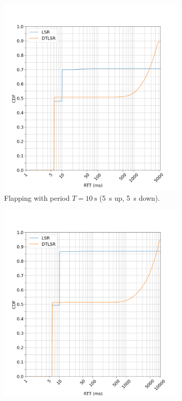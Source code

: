\documentclass[withindex,glossary,openany]{cam-thesis}
\begin{document}
\pagebreak

\begin{figure}
\begin{subfigure}{9.7cm}
  \centering
  \includegraphics[width=1\linewidth]{delay_box_flap5}
  \caption{Flapping with period $T=\SI{10}{\s}$ (\SI{5}{\s} up, \SI{5}{\s} down).}
  \label{fig:box_5}
\end{subfigure}
\begin{subfigure}{9.7cm}
  \centering
  \includegraphics[width=1\linewidth]{delay_box_flap10}

\end{subfigure}
\end{figure}
\end{document}
